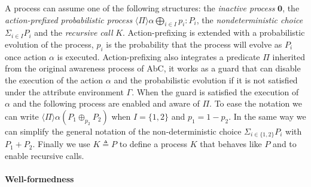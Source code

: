 \documentclass{article}
\theoremstyle{remark}
\begin{document}
A process can assume one of the following structures: the \emph{inactive process} $\mathbf{0}$, the \emph{action-prefixed probabilistic process}  $\langle\Pi\rangle \alpha\bigoplus_{i \in I} p_i : P_i$, the \emph{nondeterministic choice} $\Sigma_{i \in I} P_i$ and the \emph{recursive call} $K$.
Action-prefixing is extended with a probabilistic evolution of the process, $p_i$ is the probability that the process will evolve as $P_i$ once action $\alpha$ is executed. Action-prefixing also integrates a predicate $\Pi$ inherited from the original awareness process of AbC, it works as a guard that can disable the execution of the action $\alpha$ and the probabilistic evolution if it is not satisfied under the attribute environment $\Gamma$. When the guard is satisfied the execution of $\alpha$ and the following process are enabled and aware of $\Pi$. To ease the notation we can write $\langle\Pi\rangle \alpha (P_1 \oplus_{p_2} P_2)$ when $I = \{1,2\}$ and $p_1 = 1-p_2$.
In the same way we can simplify the general notation of the non-deterministic choice $\Sigma_{i \in \{1,2\}} P_i$ with $P_1 + P_2$. Finally we use $K \triangleq P$ to define a process $K$ that behaves like $P$ and to enable recursive calls.
\\


\paragraph{Well-formedness} %
\label{par:well_formedness}
\end{document}
